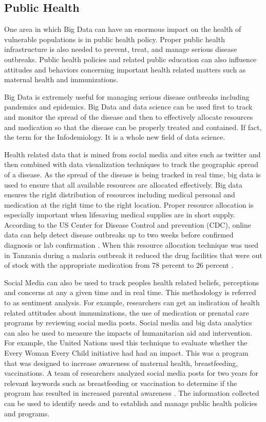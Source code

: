 \documentclass[sigconf]{acmart}
\begin{document}
\subsection{Public Health}
One area in which Big Data can have an enormous impact on the health of vulnerable populations is in public health policy. Proper public health infrastructure is also needed to prevent, treat, and manage serious disease outbreaks. Public health policies and related public education can also influence attitudes and behaviors concerning important health related matters such as maternal health and immunizations. 

Big Data is extremely useful for managing serious disease outbreaks including pandemics and epidemics. Big Data and data science can be used first to track and monitor the spread of the disease and then to effectively allocate resources and medication so that the disease can be properly treated and contained. If fact, the term for the Infodemiology. It is a whole new field of data science.

Health related data that is mined from social media and sites such as twitter and then combined with data visualization techniques to track the geographic spread of a disease. As the spread of the disease is being tracked in real time, big data is used to ensure that all available resources are allocated effectively. Big data ensures the right distribution of resources including medical personal and medication at the right time to the right location. Proper resource allocation is especially important when lifesaving medical supplies are in short supply. According to the US Center for Disease Control and prevention (CDC), online data can help detect disease outbreaks up to two weeks before confirmed diagnosis or lab confirmation \cite{www-google-GloPls}. When this resource allocation technique was used in Tanzania during a malaria outbreak it reduced the drug facilities that were out of stock with the appropriate medication from 78 percent to 26 percent \cite{DevEcon}.

Social Media can also be used to track peoples health related beliefs, perceptions and concerns at any a given time and in real time. This methodology is referred to as sentiment analysis. For example, researchers can get an indication of health related attitudes about immunizations, the use of medication or prenatal care programs by reviewing social media posts. Social media and big data analytics can also be used to measure the impacts of humanitarian aid and intervention. For example, the United Nations used this technique to evaluate whether the Every Woman Every Child initiative had had an impact. This was a program that was designed to increase awareness of maternal health, breastfeeding, vaccinations. A team of researchers analyzed social media posts for two years for relevant keywords such as breastfeeding or vaccination to determine if the program has resulted in increased parental awareness \cite{DevEcon}.
The information collected can be used to identify needs and to establish and manage public health policies and programs.
\end{document}
